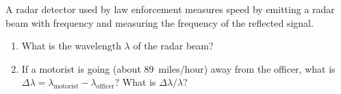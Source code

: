 \begin{exercisebox}
A radar detector used by law enforcement measures speed by emitting a radar beam with frequency  and measuring the frequency of the reflected signal.
\begin{enumerate}
\item What is the wavelength $\lambda$ of the radar beam?
\item If a motorist is going  (about 89~miles/hour) away from the officer, what is $\Delta\lambda = \lambda_{\mathrm{motorist}} - \lambda_{\mathrm{officer}}$? What is $\Delta\lambda/\lambda$?
\end{enumerate}
\end{exercisebox}

